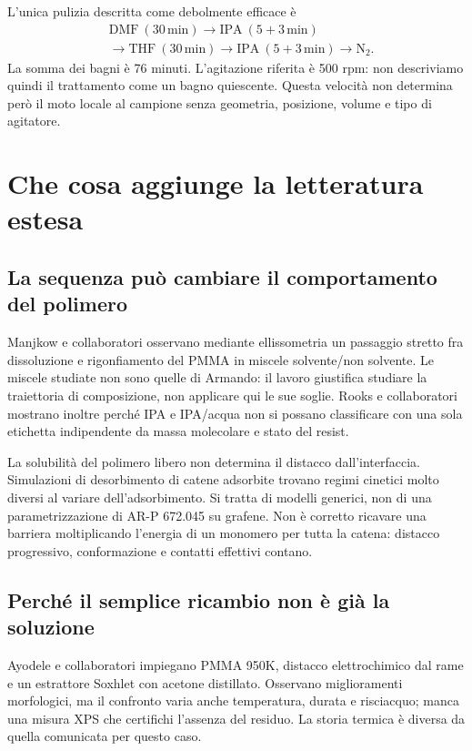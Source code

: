 \documentclass[11pt,reqno]{amsart}
\numberwithin{equation}{section}
\begin{document}
L'unica pulizia descritta come debolmente efficace \`e
\begin{equation}\label{eq:real}
\begin{split}
 &\mathrm{DMF}\ (30\,\mathrm{min})
 \longrightarrow \mathrm{IPA}\ (5+3\,\mathrm{min})\\[-2pt]
 &\longrightarrow \mathrm{THF}\ (30\,\mathrm{min})
 \longrightarrow \mathrm{IPA}\ (5+3\,\mathrm{min})
 \longrightarrow \mathrm{N_2}.
\end{split}
\end{equation}
La somma dei bagni \`e 76 minuti. L'agitazione riferita \`e 500 rpm:
non descriviamo quindi il trattamento come un bagno quiescente.
Questa velocit\`a non determina per\`o il moto locale al campione
senza geometria, posizione, volume e tipo di agitatore.

\section{Che cosa aggiunge la letteratura estesa}

\subsection{La sequenza pu\`o cambiare il comportamento del polimero}
Manjkow e collaboratori \cite{Manjkow1987} osservano mediante
ellissometria un passaggio stretto fra dissoluzione e rigonfiamento
del PMMA in miscele solvente/non solvente. Le miscele studiate non
sono quelle di Armando: il lavoro giustifica studiare la traiettoria
di composizione, non applicare qui le sue soglie. Rooks e
collaboratori \cite{Rooks2002} mostrano inoltre perch\'e IPA e
IPA/acqua non si possano classificare con una sola etichetta
indipendente da massa molecolare e stato del resist.

La solubilit\`a del polimero libero non determina il distacco
dall'interfaccia. Simulazioni di desorbimento di catene adsorbite
\cite{Huston2020} trovano regimi cinetici molto diversi al variare
dell'adsorbimento. Si tratta di modelli generici, non di una
parametrizzazione di AR-P 672.045 su grafene. Non \`e corretto
ricavare una barriera moltiplicando l'energia di un monomero per
tutta la catena: distacco progressivo, conformazione e contatti
effettivi contano.

\subsection{Perch\'e il semplice ricambio non \`e gi\`a la soluzione}
Ayodele e collaboratori \cite{Ayodele2022} impiegano PMMA 950K,
distacco elettrochimico dal rame e un estrattore Soxhlet con acetone
distillato. Osservano miglioramenti morfologici, ma il confronto
varia anche temperatura, durata e risciacquo; manca una misura XPS
che certifichi l'assenza del residuo. La storia termica \`e diversa
da quella comunicata per questo caso.
\end{document}
